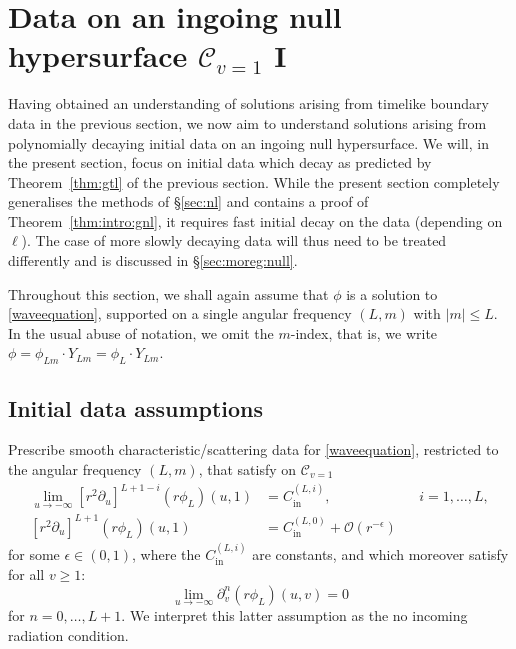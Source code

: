 \documentclass[11pt,english]{article}
\numberwithin{equation}{section}
\theoremstyle{remark}
\theoremstyle{plain}
\theoremstyle{remark}
\newcommand{\pu}{\partial_u}
\newcommand{\pv}{\partial_v}
\renewcommand{\(}{\left(}
\renewcommand{\)}{\right)}
\begin{document}

\newpage
\section{Data on an ingoing null hypersurface \texorpdfstring{$\mathcal C_{v=1}$}{C(v=1)} I}\label{sec:general:null}
Having obtained an understanding of solutions arising from timelike boundary data in the previous section, we now aim to understand solutions arising from polynomially decaying initial data on an ingoing null hypersurface. 
We will, in the present section, focus on initial data which decay as predicted by Theorem~\ref{thm:gtl} of the previous section. 
While the present section completely generalises the methods of \S \ref{sec:nl} and contains a proof of Theorem~\ref{thm:intro:gnl}, it requires fast initial decay on the data (depending on $\ell$).
The case of more slowly decaying data will thus need to be treated differently and is discussed in \S \ref{sec:moreg:null}.


Throughout this section, we shall again assume that $\phi$ is a solution to \eqref{waveequation}, supported on a single angular frequency $(L,m)$ with $|m|\leq L$. In the usual abuse of notation, we omit the $m$-index, that is, we write $\phi=\phi_{Lm}\cdot Y_{Lm}=\phi_L\cdot  Y_{Lm}$.
\subsection{Initial data assumptions}\label{sec.9.1}
\newcommand{\cl}[1]{C_{\mathrm{in}}^{(L,#1)}}
Prescribe smooth characteristic/scattering data for \eqref{waveequation}, restricted to the angular frequency $(L,m)$,  that satisfy on $\mathcal C_{v=1}$
\begin{align}\label{eq:gnl:ass1}
	\lim_{u\to-\infty}[r^2\pu]^{L+1-i}(r\phi_L)(u,1)&=\cl{i},&& i=1,\dots,L,\\
	[r^2\pu]^{L+1}(r\phi_L)(u,1)&=\cl{0}+\mathcal{O}(r^{-\epsilon})\label{eq:gnl:ass2}
\end{align}
for some $\epsilon\in(0,1)$, where the $\cl{i}$ are constants, and which moreover satisfy for all $v\geq 1$:
\begin{equation}\label{eq:gnl:assNoIncoming}
\lim_{u\to-\infty}\pv^n(r\phi_L)(u,v)=0
\end{equation}
for $n=0,\dots, L+1$. We interpret this latter assumption as the no incoming radiation condition.
\end{document}
